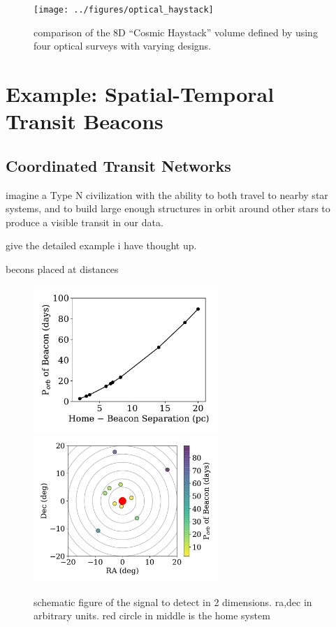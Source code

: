 \documentclass[twocolumn]{aastex62}
\begin{document}
\begin{figure}[]
\centering
\texttt{[image: ../figures/optical\_haystack]}
\caption{
comparison of the 8D ``Cosmic Haystack'' volume defined by \citet{wright2018c} using four optical surveys with varying designs. 
}
\label{fig:hay}
\end{figure}



\section{Example: Spatial-Temporal\\ Transit Beacons}
\label{sec:transit}


\subsection{Coordinated Transit Networks}
imagine a Type N civilization with the ability to both travel to nearby star systems, and to build large enough structures in orbit around other stars to produce a visible transit in our data.

give the detailed example i have thought up.

becons placed at distances


\begin{figure}[]
\centering
\includegraphics[width=2.75in]{../figures/dist_per.pdf}
\includegraphics[width=2.75in]{../figures/sky_per.pdf}
\caption{schematic figure of the signal to detect in 2 dimensions. ra,dec in arbitrary units. red circle in middle is the home system}
\label{fig:2d}
\end{figure}
\end{document}
